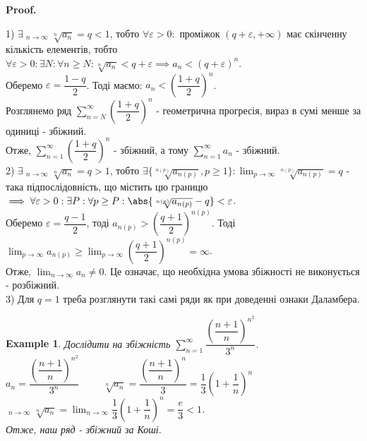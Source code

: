 \documentclass[a4paper, 10pt]{article}
\makeatletter
\DeclareMathOperator*\uplim{\overline{lim}}
\def\huge{\displaystyle}
\def\qed{$\blacksquare$}
\theoremstyle{theoremdd}
\theoremstyle{theoremdd}
\theoremstyle{theoremdd}
\theoremstyle{theoremdd}
\theoremstyle{theoremdd}
\newtheorem{example}[theorem]{Example}
\theoremstyle{theoremdd}
\theoremstyle{theoremdd}
\theoremstyle{theoremdd}
\theoremstyle{theoremdd}
\renewenvironment{proof}[1][Proof.\\]{\par
\pushQED{\hfill \qed}%
\normalfont \topsep6\p@\@plus6\p@\relax
\trivlist
\item\relax
{\bfseries
#1\@addpunct{.}}\hspace\labelsep\ignorespaces
}{%
\popQED\endtrivlist\@endpefalse
}
\makeatother
\begin{document}
\begin{proof}
1) $\exists \huge \uplim_{n \to \infty} \sqrt[n]{a_n} = q < 1$, тобто $\forall \varepsilon > 0:$ проміжок $(q+\varepsilon,+\infty)$ має скінченну кількість елементів, тобто \\ 
$\forall \varepsilon > 0: \exists N: \forall n \geq N: \sqrt[n]{a_n} < q + \varepsilon \implies a_n < (q + \varepsilon)^n$.\\
Оберемо $\varepsilon = \dfrac{1-q}{2}$. Тоді маємо: $a_n < \left( \dfrac{1+q}{2} \right)^n$.\\
Розглянемо ряд $\huge \sum_{n = N}^{\infty} \left( \dfrac{1+q}{2} \right)^n$ - геометрична прогресія, вираз в сумі менше за одиниці - збіжний.\\
Отже, $\huge \sum_{n = 1}^{\infty} \left( \dfrac{1+q}{2} \right)^n$ - збіжний, а тому $\huge \sum_{n=1}^{\infty} a_n$ - збіжний.
\bigskip \\
2) $\exists \huge \uplim_{n \to \infty} \sqrt[n]{a_n} = q > 1$, тобто $\exists \{\sqrt[n(p)]{a_{n(p)}}, p \geq 1 \}: \huge \lim_{p \to \infty} \sqrt[n(p)]{a_{n(p)}} = q$ - така підпослідовність, що містить цю границю $\implies \forall \varepsilon > 0: \exists P: \forall p \geq P: \abs{\sqrt[n(p)]{a_{n(p)}} - q} < \varepsilon$.\\
Оберемо $\varepsilon = \dfrac{q-1}{2}$, тоді $a_{n(p)} > \left( \dfrac{q+1}{2} \right)^{n(p)}$. Тоді $\huge \lim_{p \to \infty} a_{n(p)} \geq \lim_{p \to \infty} \left( \dfrac{q+1}{2} \right)^{n(p)} = \infty$.\\
Отже, $\huge \lim_{n \to \infty} a_n \neq 0$. Це означає, що необхідна умова збіжності не виконується - розбіжний.
\bigskip \\
3) Для $q=1$ треба розглянути такі самі ряди як при доведенні ознаки Даламбера.
\end{proof}

\begin{example}
Дослідити на збіжність $\huge\sum_{n=1}^\infty \dfrac{\left( \dfrac{n+1}{n} \right)^{n^2}}{3^n}$.\\
$a_n = \dfrac{\left( \dfrac{n+1}{n} \right)^{n^2}}{3^n} \hspace{1cm} \sqrt[n]{a_n} = \dfrac{\left( \dfrac{n+1}{n} \right)^n}{3} = \dfrac{1}{3} \left( 1 + \dfrac{1}{n} \right)^n$\\
$\huge\uplim_{n \to \infty} \sqrt[n]{a_n} = \lim_{n \to \infty} \dfrac{1}{3} \left( 1 + \dfrac{1}{n} \right)^n = \dfrac{e}{3} < 1$.\\
Отже, наш ряд - збіжний за Коші.
\end{example}
\end{document}
